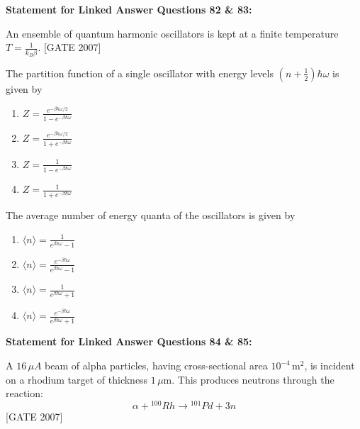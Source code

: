 \textbf{Statement for Linked Answer Questions 82 \& 83:}

An ensemble of quantum harmonic oscillators is kept at a finite temperature $T = \frac{1}{k_B\beta}$.  \hfill{[GATE 2007]}


    \item  The partition function of a single oscillator with energy levels $\left(n + \frac{1}{2}\right) \hbar \omega$ is given by
    \begin{multicols}{2}
    \begin{enumerate}
        \item $Z = \frac{e^{-\beta \hbar \omega / 2}}{1 - e^{-\beta \hbar \omega}}$\\
        \item $Z = \frac{e^{-\beta \hbar \omega / 2}}{1 + e^{-\beta \hbar \omega}}$
        \item $Z = \frac{1}{1 - e^{-\beta \hbar \omega}}$\\
        \item $Z = \frac{1}{1 + e^{-\beta \hbar \omega}}$
    \end{enumerate}
    \end{multicols}

    \item  The average number of energy quanta of the oscillators is given by
    \begin{multicols}{2}
    \begin{enumerate}
        \item $\langle n \rangle = \frac{1}{e^{\beta \hbar \omega} - 1}$\\
        \item $\langle n \rangle = \frac{e^{-\beta \hbar \omega}}{e^{\beta \hbar \omega} - 1}$
        \item $\langle n \rangle = \frac{1}{e^{\beta \hbar \omega} + 1}$\\
        \item $\langle n \rangle = \frac{e^{-\beta \hbar \omega}}{e^{\beta \hbar \omega} + 1}$
    \end{enumerate}
    \end{multicols}


\bigskip

\textbf{Statement for Linked Answer Questions 84 \& 85:}

A $16 \, \mu A$ beam of alpha particles, having cross-sectional area $10^{-4} \, \text{m}^2$, is incident on a rhodium target of thickness $1 \, \mu \text{m}$. This produces neutrons through the reaction:
\[
\alpha + {}^{100}Rh \rightarrow {}^{101}Pd + 3n
\] \hfill{[GATE 2007]}


